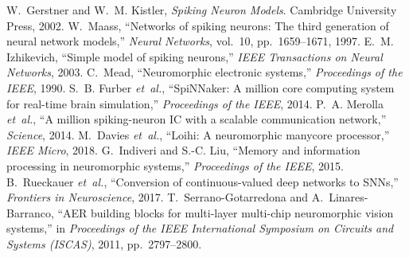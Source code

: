 \documentclass[12pt,a4paper]{article}
\begin{document}
\begin{thebibliography}{10}
W.~Gerstner and W.~M. Kistler, \emph{Spiking Neuron Models}. Cambridge University Press, 2002.
W.~Maass, ``Networks of spiking neurons: The third generation of neural network models,'' \emph{Neural Networks}, vol.~10, pp.~1659--1671, 1997.
E.~M. Izhikevich, ``Simple model of spiking neurons,'' \emph{IEEE Transactions on Neural Networks}, 2003.
C.~Mead, ``Neuromorphic electronic systems,'' \emph{Proceedings of the IEEE}, 1990.
S.~B. Furber \emph{et~al.}, ``SpiNNaker: A million core computing system for real-time brain simulation,'' \emph{Proceedings of the IEEE}, 2014.
P.~A. Merolla \emph{et~al.}, ``A million spiking-neuron IC with a scalable communication network,'' \emph{Science}, 2014.
M.~Davies \emph{et~al.}, ``Loihi: A neuromorphic manycore processor,'' \emph{IEEE Micro}, 2018.
G.~Indiveri and S.-C. Liu, ``Memory and information processing in neuromorphic systems,'' \emph{Proceedings of the IEEE}, 2015.
B.~Rueckauer \emph{et~al.}, ``Conversion of continuous-valued deep networks to SNNs,'' \emph{Frontiers in Neuroscience}, 2017.
T.~Serrano-Gotarredona and A.~Linares-Barranco, ``AER building blocks for multi-layer multi-chip neuromorphic vision systems,'' in \emph{Proceedings of the IEEE International Symposium on Circuits and Systems (ISCAS)}, 2011, pp.~2797--2800.
\end{thebibliography}
\end{document}
